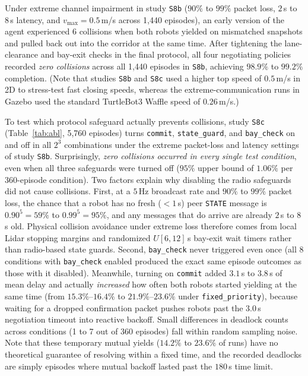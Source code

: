 Under extreme channel impairment in study \texttt{S8b} ($90\%$ to $99\%$ packet loss, $2$\,s to $8$\,s latency, and $v_{\max}=0.5$\,m/s across 1,440 episodes), an early version of the agent experienced 6 collisions when both robots yielded on mismatched snapshots and pulled back out into the corridor at the same time. After tightening the lane-clearance and bay-exit checks in the final protocol, all four negotiating policies recorded \emph{zero collisions} across all 1,440 episodes in \texttt{S8b}, achieving $98.9\%$ to $99.2\%$ completion. (Note that studies \texttt{S8b} and \texttt{S8c} used a higher top speed of $0.5$\,m/s in 2D to stress-test fast closing speeds, whereas the extreme-communication runs in Gazebo used the standard TurtleBot3 Waffle speed of $0.26$\,m/s.)

To test which protocol safeguard actually prevents collisions, study \texttt{S8c} (Table~\ref{tab:abl}, 5,760 episodes) turns \texttt{commit}, \texttt{state\_guard}, and \texttt{bay\_check} on and off in all $2^3$ combinations under the extreme packet-loss and latency settings of study \texttt{S8b}. Surprisingly, \emph{zero collisions occurred in every single test condition}, even when all three safeguards were turned off ($95\%$ upper bound of $1.06\%$ per 360-episode condition). Two factors explain why disabling the radio safeguards did not cause collisions. First, at a $5$\,Hz broadcast rate and $90\%$ to $99\%$ packet loss, the chance that a robot has no fresh ($<1$\,s) peer \texttt{STATE} message is $0.90^5=59\%$ to $0.99^5=95\%$, and any messages that do arrive are already $2$\,s to $8$\,s old. Physical collision avoidance under extreme loss therefore comes from local Lidar stopping margins and randomized $U[6,12]$\,s bay-exit wait timers rather than radio-based state guards. Second, \texttt{bay\_check} never triggered even once (all 8 conditions with \texttt{bay\_check} enabled produced the exact same episode outcomes as those with it disabled). Meanwhile, turning on \texttt{commit} added $3.1$\,s to $3.8$\,s of mean delay and actually \emph{increased} how often both robots started yielding at the same time (from $15.3\%$--$16.4\%$ to $21.9\%$--$23.6\%$ under \texttt{fixed\_priority}), because waiting for a dropped confirmation packet pushes robots past the $3.0$\,s negotiation timeout into reactive backoff. Small differences in deadlock counts across conditions (1 to 7 out of 360 episodes) fall within random sampling noise. Note that these temporary mutual yields ($14.2\%$ to $23.6\%$ of runs) have no theoretical guarantee of resolving within a fixed time, and the recorded deadlocks are simply episodes where mutual backoff lasted past the $180$\,s time limit.

